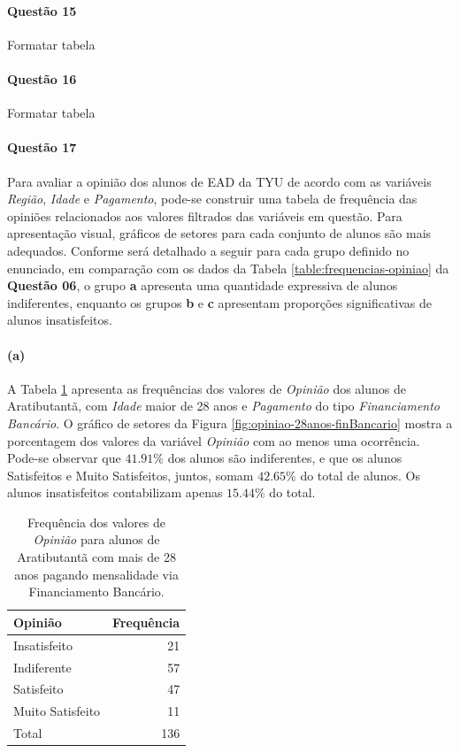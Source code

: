 \documentclass[10pt,a4paper,oneside]{article}
\newcommand{\arat}{Aratibutantã\xspace}
\begin{document}
\paragraph{Questão 15}
Formatar tabela

%

\paragraph{Questão 16}
Formatar tabela


\FloatBarrier
\paragraph{Questão 17}

Para avaliar a opinião dos alunos de EAD da TYU de acordo com as variáveis \textit{Região}, \textit{Idade} e \textit{Pagamento}, pode-se construir uma tabela de frequência das opiniões relacionados aos valores filtrados das variáveis em questão. Para apresentação visual, gráficos de setores para cada conjunto de alunos são mais adequados. Conforme será detalhado a seguir para cada grupo definido no enunciado, em comparação com os dados da Tabela \ref{table:frequencias-opiniao} da \textbf{Questão 06}, o grupo \textbf{a} apresenta uma quantidade expressiva de alunos indiferentes, enquanto os grupos \textbf{b} e \textbf{c} apresentam proporções significativas de alunos insatisfeitos.

\paragraph{(a)} A Tabela \ref{table:opiniao-28anos-finBancario} apresenta as frequências dos valores de \textit{Opinião} dos alunos de \arat, com \textit{Idade} maior de 28 anos e \textit{Pagamento} do tipo \textit{Financiamento Bancário}. O gráfico de setores da Figura \ref{fig:opiniao-28anos-finBancario} mostra a porcentagem dos valores da variável \textit{Opinião} com ao menos uma ocorrência.
Pode-se observar que $41.91\%$ dos alunos são indiferentes, e que os alunos Satisfeitos e Muito Satisfeitos, juntos, somam $42.65\%$ do total de alunos. Os alunos insatisfeitos contabilizam apenas $15.44\%$ do total.


\begin{table}[!h]
	\small
	\centering
	\caption{Frequência dos valores de \textit{Opinião} para alunos de \arat com mais de 28 anos pagando mensalidade via Financiamento Bancário.}
	\label{table:opiniao-28anos-finBancario}
	\begin{tabular}{l r}
		\toprule
		\textbf{Opinião} & \textbf{Frequência} \\
		\midrule
		Insatisfeito     &  21 \\
		Indiferente      &  57 \\
		Satisfeito       &  47 \\
		Muito Satisfeito &  11 \\
		\midrule
		Total            &  136 \\
		\bottomrule
	\end{tabular}
\end{table}
\end{document}
